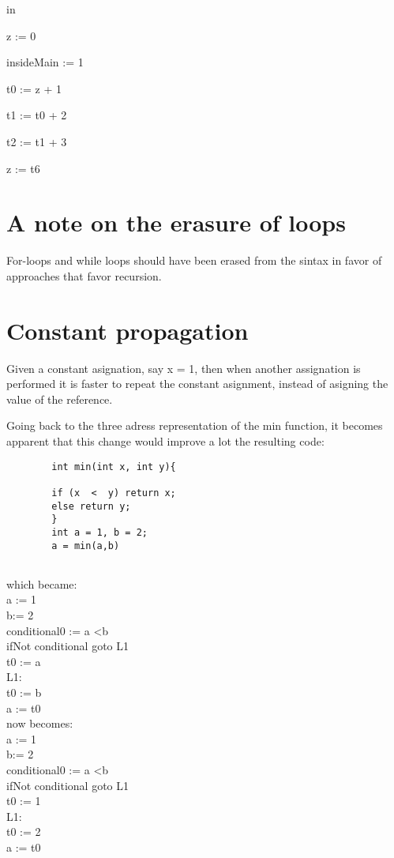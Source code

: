 \documentclass[twocolumn,10ptr]{article}
\begin{document}
	 in	
	
	z := 0
	
	insideMain := 1
	
	t0 := z + 1
	
	t1 := t0 + 2
	
	t2 := t1 + 3
	
	z := t6 \\
	
	
	
	\section{A note on the erasure of loops}
	
	For-loops and while loops should have been erased from the sintax in favor of approaches that favor recursion.
	
	\section{Constant propagation}
	
	Given a constant asignation, say x = 1, then when another assignation is performed it is 
	faster to repeat the constant asignment, instead of asigning the value of the reference.
	
	Going back to the three adress representation of the min function, it becomes apparent
	that this change would improve a lot the resulting code: 
	
	
	
	\begin{lstlisting}
		int min(int x, int y){ 
	
		if (x  <  y) return x;
		else return y; 
		}
		int a = 1, b = 2; 
		a = min(a,b)
	
	\end{lstlisting}
	
	which became: \\
	a := 1 \\
	b:= 2 \\
	conditional0 := a \textless b\\
	ifNot conditional goto L1\\
		t0 := a\\
	L1: \\
		t0 := b\\
		a := t0\\
	
	now becomes: \\
	a := 1 \\
	b:= 2 \\
	conditional0 := a \textless b\\
	ifNot conditional goto L1\\
		t0 := 1\\
	L1: \\
		t0 := 2\\
		a := t0\\
		
\end{document}
